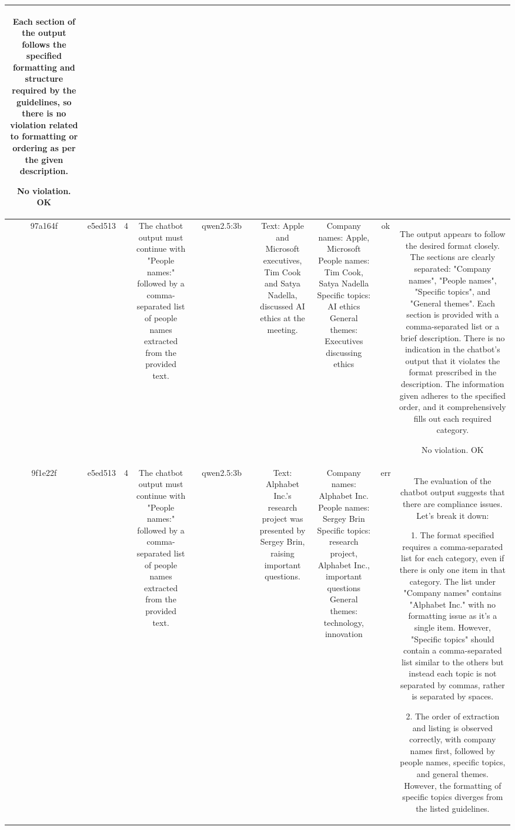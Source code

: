 \begin{table}[h!]
\begin{tabular}{|c|c|c|c|c|c|c|c|c|c|c|}
Each section of the output follows the specified formatting and structure required by the guidelines, so there is no violation related to formatting or ordering as per the given description.

No violation.
OK\\
\hline
97a164f & e5ed513 & 4 & The chatbot output must continue with "People names:" followed by a comma-separated list of people names extracted from the provided text. &  & qwen2.5:3b &  & Text: Apple and Microsoft executives, Tim Cook and Satya Nadella, discussed AI ethics at the meeting. & Company names: Apple, Microsoft
People names: Tim Cook, Satya Nadella
Specific topics: AI ethics
General themes: Executives discussing ethics & ok & The output appears to follow the desired format closely. The sections are clearly separated: "Company names", "People names", "Specific topics", and "General themes". Each section is provided with a comma-separated list or a brief description. There is no indication in the chatbot's output that it violates the format prescribed in the description. The information given adheres to the specified order, and it comprehensively fills out each required category.

No violation.
OK\\
\hline
9f1e22f & e5ed513 & 4 & The chatbot output must continue with "People names:" followed by a comma-separated list of people names extracted from the provided text. &  & qwen2.5:3b &  & Text: Alphabet Inc.'s research project was presented by Sergey Brin, raising important questions. & Company names: Alphabet Inc.
People names: Sergey Brin
Specific topics: research project, Alphabet Inc., important questions
General themes: technology, innovation & err & The evaluation of the chatbot output suggests that there are compliance issues. Let's break it down:

1. The format specified requires a comma-separated list for each category, even if there is only one item in that category. The list under "Company names" contains "Alphabet Inc." with no formatting issue as it's a single item. However, "Specific topics" should contain a comma-separated list similar to the others but instead each topic is not separated by commas, rather is separated by spaces.

2. The order of extraction and listing is observed correctly, with company names first, followed by people names, specific topics, and general themes. However, the formatting of specific topics diverges from the listed guidelines.


\end{tabular}
\end{table}
